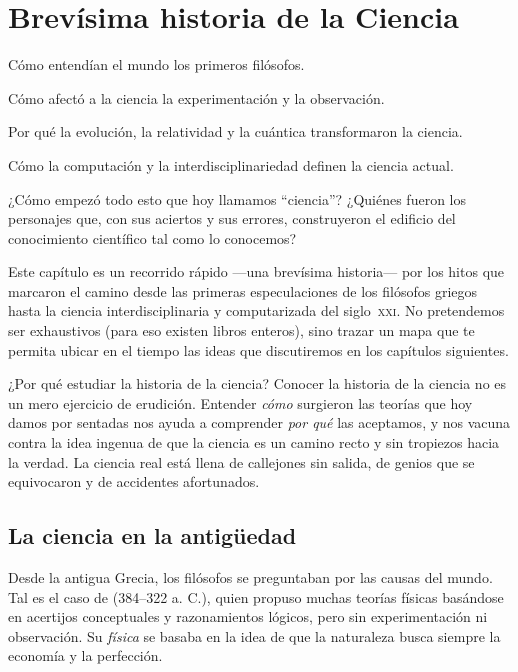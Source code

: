 \chapter{Brevísima historia de la Ciencia}
\label{cha:historiaciencia}

\begin{enestecapitulo}
	\item[\emoji{classical-building}] Cómo entendían el mundo los primeros filósofos.
	\item[\emoji{telescope}] Cómo afectó a la ciencia la experimentación y la observación.
	\item[\emoji{atom-symbol}] Por qué la evolución, la relatividad y la cuántica transformaron la ciencia.
	\item[\emoji{robot}] Cómo la computación y la interdisciplinariedad definen la ciencia actual.
\end{enestecapitulo}

¿Cómo empezó todo esto que hoy llamamos “ciencia”?
¿Quiénes fueron los personajes que, con sus aciertos y sus errores, construyeron el edificio del conocimiento científico tal como lo conocemos?

Este capítulo es un recorrido rápido —una brevísima historia— por los hitos que marcaron el camino desde las primeras especulaciones de los filósofos griegos hasta la ciencia interdisciplinaria y computarizada del siglo~\textsc{xxi}.
No pretendemos ser exhaustivos (para eso existen libros enteros), sino trazar un mapa que te permita ubicar en el tiempo las ideas que discutiremos en los capítulos siguientes.

\begin{digress}{¿Por qué estudiar la historia de la ciencia?}
	Conocer la historia de la ciencia no es un mero ejercicio de erudición.
	Entender \emph{cómo} surgieron las teorías que hoy damos por sentadas nos ayuda a comprender \emph{por qué} las aceptamos, y nos vacuna contra la idea ingenua de que la ciencia es un camino recto y sin tropiezos hacia la verdad.
	La ciencia real está llena de callejones sin salida, de genios que se equivocaron y de accidentes afortunados.
\end{digress}

\section{La ciencia en la antigüedad}
\label{sec:cienciaenlaantiguedad}

Desde la antigua Grecia, los filósofos se preguntaban por las causas del mundo.
Tal es el caso de  (384--322 a. C.), quien propuso muchas teorías físicas basándose en acertijos conceptuales y razonamientos lógicos, pero sin experimentación ni observación\cite{Shields2023}.
Su \emph{física} se basaba en la idea de que la naturaleza busca siempre la economía y la perfección.

